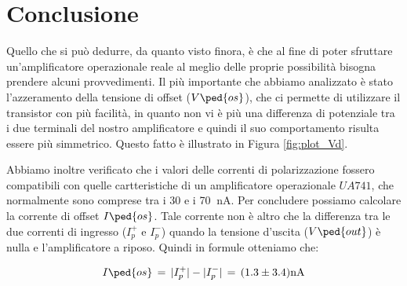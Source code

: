 \section*{Conclusione}

Quello che si può dedurre, da quanto visto finora, è che al fine di poter sfruttare un'amplificatore operazionale reale al meglio delle proprie possibilità bisogna prendere alcuni provvedimenti. Il più importante che abbiamo analizzato è stato l'azzeramento della tensione di offset ($V\ped{os}$), che ci permette di utilizzare il transistor con più facilità, in quanto non vi è più una differenza di potenziale tra i due terminali del nostro amplificatore e quindi il suo comportamento risulta essere più simmetrico. Questo fatto è illustrato in Figura \ref{fig:plot_Vd}.

Abbiamo inoltre verificato che i valori delle correnti di polarizzazione fossero compatibili con quelle cartteristiche di un amplificatore operazionale $UA741$, che normalmente sono comprese tra i 30 e i 70 $\SI{}{\nano\ampere}$.
Per concludere possiamo calcolare la corrente di offset $I\ped{os}$. Tale corrente non è altro che la differenza tra le due correnti di ingresso ($I_{p}^+$ e $I_{p}^-$) quando la tensione d'uscita ($V\ped{out}$) è nulla e l'amplificatore a riposo.
Quindi in formule otteniamo che:

\begin{equation}
	I\ped{os}\,=\,|I_{p}^+|-|I_{p}^-|\,=\,(1.3\pm3.4)\SI{}{\nano\ampere}
\end{equation}